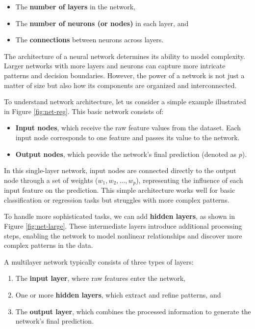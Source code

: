 \documentclass[
]{book}
\providecommand{\tightlist}{%
  \setlength{\itemsep}{0pt}\setlength{\parskip}{0pt}}
\theoremstyle{definition}
\theoremstyle{definition}
\theoremstyle{definition}
\theoremstyle{definition}
\theoremstyle{remark}
\begin{document}
\begin{itemize}
\tightlist
\item
  The \textbf{number of layers} in the network,\\
\item
  The \textbf{number of neurons (or nodes)} in each layer, and\\
\item
  The \textbf{connections} between neurons across layers.
\end{itemize}

The architecture of a neural network determines its ability to model complexity. Larger networks with more layers and neurons can capture more intricate patterns and decision boundaries. However, the power of a network is not just a matter of size but also how its components are organized and interconnected.

To understand network architecture, let us consider a simple example illustrated in Figure \ref{fig:net-reg}. This basic network consists of:

\begin{itemize}
\tightlist
\item
  \textbf{Input nodes}, which receive the raw feature values from the dataset. Each input node corresponds to one feature and passes its value to the network.\\
\item
  \textbf{Output nodes}, which provide the network's final prediction (denoted as \(p\)).
\end{itemize}

In this single-layer network, input nodes are connected directly to the output node through a set of weights (\(w_1, w_2, \dots, w_p\)), representing the influence of each input feature on the prediction. This simple architecture works well for basic classification or regression tasks but struggles with more complex patterns.

To handle more sophisticated tasks, we can add \textbf{hidden layers}, as shown in Figure \ref{fig:net-large}. These intermediate layers introduce additional processing steps, enabling the network to model nonlinear relationships and discover more complex patterns in the data.

A multilayer network typically consists of three types of layers:

\begin{enumerate}
\def\labelenumi{\arabic{enumi}.}
\tightlist
\item
  The \textbf{input layer}, where raw features enter the network,\\
\item
  One or more \textbf{hidden layers}, which extract and refine patterns, and\\
\item
  The \textbf{output layer}, which combines the processed information to generate the network's final prediction.
\end{enumerate}
\end{document}
